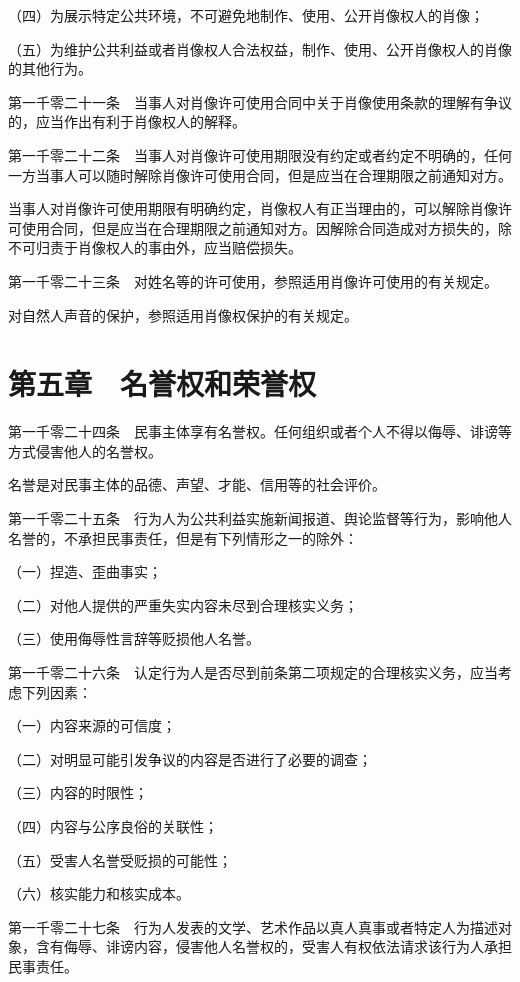 \documentclass[UTF8,12pt,a4paper]{ctexbook}
\begin{document}
（四）为展示特定公共环境，不可避免地制作、使用、公开肖像权人的肖像；

（五）为维护公共利益或者肖像权人合法权益，制作、使用、公开肖像权人的肖像的其他行为。

第一千零二十一条　当事人对肖像许可使用合同中关于肖像使用条款的理解有争议的，应当作出有利于肖像权人的解释。

第一千零二十二条　当事人对肖像许可使用期限没有约定或者约定不明确的，任何一方当事人可以随时解除肖像许可使用合同，但是应当在合理期限之前通知对方。

当事人对肖像许可使用期限有明确约定，肖像权人有正当理由的，可以解除肖像许可使用合同，但是应当在合理期限之前通知对方。因解除合同造成对方损失的，除不可归责于肖像权人的事由外，应当赔偿损失。

第一千零二十三条　对姓名等的许可使用，参照适用肖像许可使用的有关规定。

对自然人声音的保护，参照适用肖像权保护的有关规定。

\section*{第五章　名誉权和荣誉权}

第一千零二十四条　民事主体享有名誉权。任何组织或者个人不得以侮辱、诽谤等方式侵害他人的名誉权。

名誉是对民事主体的品德、声望、才能、信用等的社会评价。

第一千零二十五条　行为人为公共利益实施新闻报道、舆论监督等行为，影响他人名誉的，不承担民事责任，但是有下列情形之一的除外：

（一）捏造、歪曲事实；

（二）对他人提供的严重失实内容未尽到合理核实义务；

（三）使用侮辱性言辞等贬损他人名誉。

第一千零二十六条　认定行为人是否尽到前条第二项规定的合理核实义务，应当考虑下列因素：

（一）内容来源的可信度；

（二）对明显可能引发争议的内容是否进行了必要的调查；

（三）内容的时限性；

（四）内容与公序良俗的关联性；

（五）受害人名誉受贬损的可能性；

（六）核实能力和核实成本。

第一千零二十七条　行为人发表的文学、艺术作品以真人真事或者特定人为描述对象，含有侮辱、诽谤内容，侵害他人名誉权的，受害人有权依法请求该行为人承担民事责任。
\end{document}
